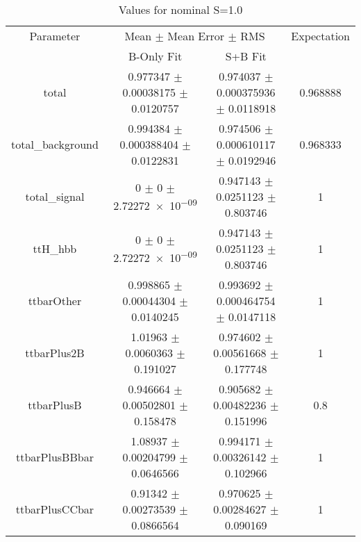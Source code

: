 \begin{table}
\centering
\caption{Values for nominal S=1.0}
\begin{tabular}{cccc}
\toprule
Parameter & \multicolumn{2}{c}{Mean $\pm$ Mean Error $\pm$ RMS} & Expectation\\
 & B-Only Fit & S+B Fit & \\
\midrule
total & \num{0.977347} $\pm$ \num{0.00038175} $\pm$ \num{0.0120757} & \num{0.974037} $\pm$ \num{0.000375936} $\pm$ \num{0.0118918} & \num{0.968888}\\
total\_background & \num{0.994384} $\pm$ \num{0.000388404} $\pm$ \num{0.0122831} & \num{0.974506} $\pm$ \num{0.000610117} $\pm$ \num{0.0192946} & \num{0.968333}\\
total\_signal & \num{0} $\pm$ \num{0} $\pm$ \num{2.72272e-09} & \num{0.947143} $\pm$ \num{0.0251123} $\pm$ \num{0.803746} & \num{1}\\
ttH\_hbb & \num{0} $\pm$ \num{0} $\pm$ \num{2.72272e-09} & \num{0.947143} $\pm$ \num{0.0251123} $\pm$ \num{0.803746} & \num{1}\\
ttbarOther & \num{0.998865} $\pm$ \num{0.00044304} $\pm$ \num{0.0140245} & \num{0.993692} $\pm$ \num{0.000464754} $\pm$ \num{0.0147118} & \num{1}\\
ttbarPlus2B & \num{1.01963} $\pm$ \num{0.0060363} $\pm$ \num{0.191027} & \num{0.974602} $\pm$ \num{0.00561668} $\pm$ \num{0.177748} & \num{1}\\
ttbarPlusB & \num{0.946664} $\pm$ \num{0.00502801} $\pm$ \num{0.158478} & \num{0.905682} $\pm$ \num{0.00482236} $\pm$ \num{0.151996} & \num{0.8}\\
ttbarPlusBBbar & \num{1.08937} $\pm$ \num{0.00204799} $\pm$ \num{0.0646566} & \num{0.994171} $\pm$ \num{0.00326142} $\pm$ \num{0.102966} & \num{1}\\
ttbarPlusCCbar & \num{0.91342} $\pm$ \num{0.00273539} $\pm$ \num{0.0866564} & \num{0.970625} $\pm$ \num{0.00284627} $\pm$ \num{0.090169} & \num{1}\\
\bottomrule
\end{tabular}
\end{table}